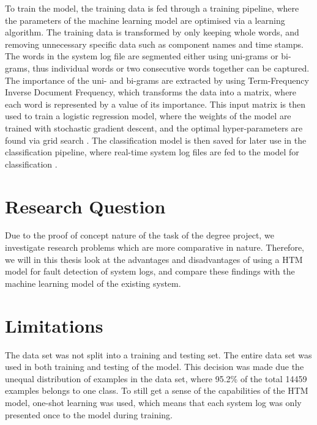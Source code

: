 To train the model, the training data is fed through a training pipeline, where the parameters of the machine learning model are optimised via a learning algorithm. The training data is transformed by only keeping whole words, and removing unnecessary specific data such as component names and time stamps. The words in the system log file are segmented either using uni-grams or bi-grams, thus individual words or  two consecutive words together can be captured. The importance of the uni- and bi-grams are extracted by using Term-Frequency Inverse Document Frequency, which transforms the data into a matrix, where each word is represented by a value of its importance. This input matrix is then used to train a logistic regression model, where the weights of the model are trained with stochastic gradient descent, and the optimal hyper-parameters are found via grid search \cite{linnaeus}. The classification model is then saved for later use in the classification pipeline, where real-time system log files are fed to the model for classification \cite{linnaeus}.


\section{Research Question}
Due to the proof of concept nature of the task of the degree project, we investigate research problems which are more comparative in nature. Therefore, we will in this thesis look at the advantages and disadvantages of using a HTM model for fault detection of system logs, and compare these findings with the machine learning model of the existing system.


\section{Limitations}
The data set was not split into a training and testing set. The entire data set was used in both training and testing of the model. This decision was made due the unequal distribution of examples in the data set, where 95.2\% of the total 14459 examples belongs to one class. To still get a sense of the capabilities of the HTM model, one-shot learning was used, which means that each system log was only presented once to the model during training.


